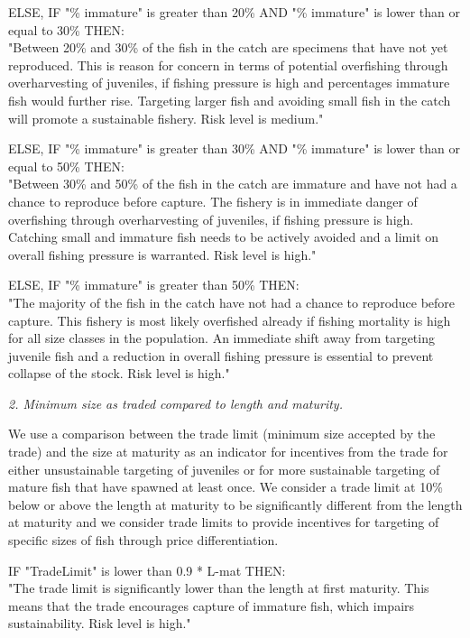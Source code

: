 ELSE, IF "\% immature" is greater than 20\% AND "\% immature" is lower than or equal to 30\% THEN:\\[0cm]
"Between 20\% and 30\% of the fish in the catch are specimens that have not yet reproduced. This is reason for concern in terms of potential overfishing through overharvesting of juveniles, if fishing pressure is high and percentages immature fish would further rise. Targeting larger fish and avoiding small fish in the catch will promote a sustainable fishery. Risk level is medium."

ELSE, IF "\% immature" is greater than 30\% AND "\% immature" is lower than or equal to 50\% THEN:\\[0cm]
"Between 30\% and 50\% of the fish in the catch are immature and have not had a chance to reproduce before capture. The fishery is in immediate danger of overfishing through overharvesting of juveniles, if fishing pressure is high.  Catching small and immature fish needs to be actively avoided and a limit on overall fishing pressure is warranted. Risk level is high."

ELSE, IF "\% immature" is greater than 50\% THEN:\\[0cm]
"The majority of the fish in the catch have not had a chance to reproduce before capture. This fishery is most likely overfished already if fishing mortality is high for all size classes in the population. An immediate shift away from targeting juvenile fish and a reduction in overall fishing pressure is essential to prevent collapse of the stock. Risk level is high."

\textit{2. Minimum size as traded compared to length and maturity.}

We use a comparison between the trade limit (minimum size accepted by the trade) and the size at maturity as an indicator for incentives from the trade for either unsustainable targeting of juveniles or for more sustainable targeting of mature fish that have spawned at least once. We consider a trade limit at 10\% below or above the length at maturity to be significantly different from the length at maturity and we consider trade limits to provide incentives for targeting of specific sizes of fish through price differentiation.

IF "TradeLimit" is lower than 0.9 * L-mat THEN:\\[0cm]
"The trade limit is significantly lower than the length at first maturity.  This means that the trade encourages capture of immature fish, which impairs sustainability. Risk level is high."

